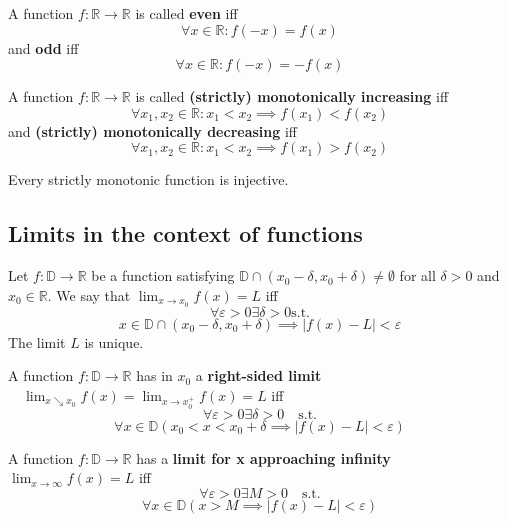 \begin{definition}
    A function $f: \mathbb{R} \to \mathbb{R}$ is called
    \textbf{even} iff 
    $$\forall x \in \mathbb{R} : f(-x) = f(x)$$
    and \textbf{odd} iff 
    $$\forall x \in \mathbb{R} : f(-x) = -f(x)$$
\end{definition}

\begin{definition}
    A function  $f: \mathbb{R} \to \mathbb{R}$ is called \textbf{(strictly) monotonically increasing} iff 
    $$\forall x_1, x_2 \in \mathbb{R} : x_1 < x_2 \implies f(x_1) < f(x_2)$$
    and \textbf{(strictly) monotonically decreasing} iff 
    $$\forall x_1, x_2 \in \mathbb{R} : x_1 < x_2 \implies f(x_1) > f(x_2)$$
\end{definition}

\begin{theorem}
    Every strictly monotonic function is injective.
\end{theorem}


\subsection{Limits in the context of functions}

\begin{definition}
    Let $f: \mathbb{D} \to \mathbb{R}$ be a function satisfying $\mathbb{D} \cap (x_0 - \delta, x_0 + \delta) \neq \emptyset$ for all $\delta > 0$ and $x_0 \in \mathbb{R}$. We say that $\lim_{x \to x_0} f(x) = L$ iff 
    $$\forall \varepsilon > 0 \exists \delta > 0  \text{s.t.}$$
    $$x \in \mathbb{D} \cap (x_0 - \delta, x_0 + \delta) \implies |f(x) - L| < \varepsilon$$
    The limit $L$ is unique.
\end{definition}

\begin{definition}
    A function $f: \mathbb{D} \to \mathbb{R}$ has in $x_0$ a
    \textbf{right-sided limit} $\quad \lim_{x \searrow x_0} f(x) = \lim_{x \to x_0^+} f(x) = L$ iff 
    $$\forall \varepsilon > 0 \exists \delta > 0  \quad \text{s.t.}$$
    $$\forall x \in \mathbb{D} (x_0 < x < x_0 + \delta \implies |f(x) - L| < \varepsilon)$$
\end{definition}

\begin{definition}
    A function $f: \mathbb{D} \to \mathbb{R}$ has a \textbf{limit for x approaching infinity} $\lim_{x \to \infty} f(x) = L$ iff 
    $$\forall \varepsilon > 0 \exists M > 0 \quad \text{s.t.}$$
    $$\forall x \in \mathbb{D} (x > M \implies |f(x) - L| < \varepsilon)$$
\end{definition}

